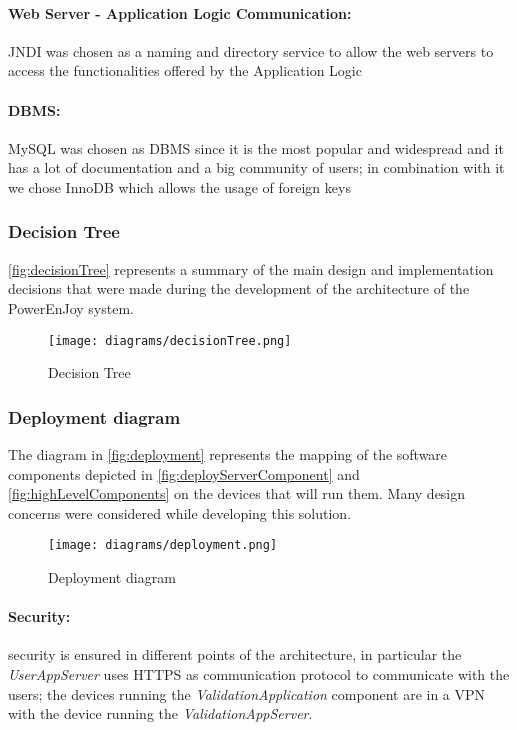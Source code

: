 \paragraph{Web Server - Application Logic Communication:} JNDI was chosen as a naming and directory service to allow the web servers to access the functionalities offered by the Application Logic
\paragraph{DBMS:} MySQL was chosen as DBMS since it is the most popular and widespread and it has a lot of documentation and a big community of users; in combination with it we chose InnoDB which allows the usage of foreign keys
\clearpage
\subsubsection{Decision Tree}
\autoref{fig:decisionTree} represents a summary of the main design and implementation decisions that were made during the development of the architecture of the PowerEnJoy system.\\

\begin{figure}[h!]
	\centering
	\texttt{[image: diagrams/decisionTree.png]}
	\caption{
		\label{fig:decisionTree}  
		Decision Tree
	}
\end{figure}
\clearpage
\subsubsection{Deployment diagram} 

The diagram in \autoref{fig:deployment} represents the mapping of the software components depicted in \autoref{fig:deployServerComponent} and \autoref{fig:highLevelComponents} on the devices that will run them. Many design concerns were considered while developing this solution.\newline\newline\newline

\begin{figure}[ht!]
	\centering
	\texttt{[image: diagrams/deployment.png]}
	\caption{
		\label{fig:deployment} 
		Deployment diagram 
	}
\end{figure}

\clearpage

\paragraph{Security:}security is ensured in different points of the architecture, in particular the \emph{UserAppServer} uses HTTPS as communication protocol to communicate with the users; the devices running the \emph{ValidationApplication} component are in a VPN with the device running the \emph{ValidationAppServer}.

